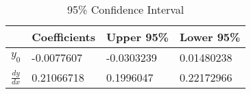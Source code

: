 \begin{table}[H]
    \centering
    \begin{tabular}{l|lll}
\rowcolor[HTML]{FFD7F4} 
\textbf{}                                  & \textbf{Coefficients} & \textbf{Upper 95\%} & \textbf{Lower 95\%} \\ \hline
\rowcolor[HTML]{FFE6F8} 
\cellcolor[HTML]{FFD7F4}\textbf{$y_0$} & -0.0077607            & -0.0303239          & 0.01480238          \\
\rowcolor[HTML]{FFE6F8} 
\cellcolor[HTML]{FFD7F4}\textbf{$\frac{dy}{dx}$}  & 0.21066718            & 0.1996047           & 0.22172966         
\end{tabular}
    \caption{95\% Confidence Interval}
    \label{tab:uncertainty}
\end{table}


